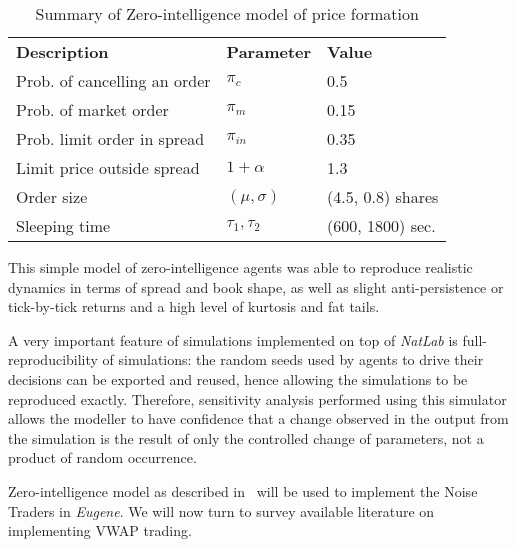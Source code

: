 \begin{table}[htbp]
\begin{center}
\begin{tabular}{ l l l }
\textbf{Description} & \textbf{Parameter} & \textbf{Value} \\
\cmidrule(r){1-3}
Prob. of cancelling an order & $\pi_c$    		& 0.5                \\
Prob. of market order		 & $\pi_m$   		& 0.15               \\
Prob. limit order in spread  & $\pi_{in}$ 		& 0.35               \\ 
Limit price outside spread   & $1+\alpha$ 		& 1.3                \\
Order size					 & $(\mu, \sigma)$	& (4.5, 0.8) shares  \\
Sleeping time				 & $\tau_1, \tau_2$ & (600, 1800) sec.   \\
\end{tabular}
\end{center}
\caption{Summary of Zero-intelligence model of price formation}
\label{Table/Zero-Intelligence}
\end{table}

This simple model of zero-intelligence agents was able to reproduce realistic dynamics in terms of spread and book shape, as well as slight anti-persistence or tick-by-tick returns and a high level of kurtosis and fat tails. 

A very important feature of simulations implemented on top of \textit{NatLab} is full-reproducibility of simulations: the random seeds used by agents to drive their decisions can be exported and reused, hence allowing the simulations to be reproduced exactly. Therefore, sensitivity analysis performed using this simulator allows the modeller to have confidence that a change observed in the output from the simulation is the result of only the controlled change of parameters, not a product of random occurrence.

Zero-intelligence model as described in~\citet[chap.~4]{Gilles2006} will be used to implement the Noise Traders in \textit{Eugene}. We will now turn to survey available literature on implementing VWAP trading.  







   







